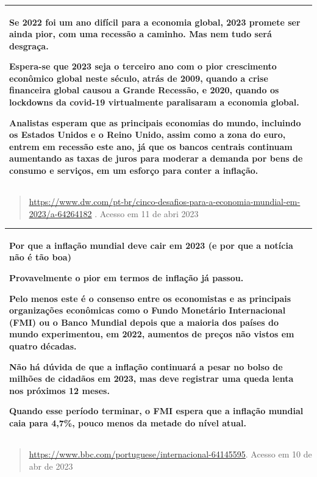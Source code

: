 {\begin{longtable}[]{@{}
  >{\raggedright\arraybackslash}p{}@{}}
Se 2022 foi um ano difícil para a economia global, 2023 promete ser
ainda pior, com uma recessão a caminho. Mas nem tudo será desgraça.

Espera-se que 2023 seja o terceiro ano com o pior crescimento econômico
global neste século, atrás de 2009, quando a crise financeira global
causou a Grande Recessão, e 2020, quando os lockdowns da covid-19
virtualmente paralisaram a economia global.

Analistas esperam que as principais economias do mundo, incluindo os
Estados Unidos e o Reino Unido, assim como a zona do euro, entrem em
recessão este ano, já que os bancos centrais continuam aumentando as
taxas de juros para moderar a demanda por bens de consumo e serviços, em
um esforço para conter a inflação. \\
\bottomrule
\end{longtable}

\begin{quote}
\href{https://www.dw.com/pt-br/cinco-desafios-para-a-economia-mundial-em-2023/a-64264182}{\uline{https://www.dw.com/pt-br/cinco-desafios-para-a-economia-mundial-em-2023/a-64264182}}
. Acesso em 11 de abri 2023
\end{quote}

\begin{longtable}[]{@{}
  >{\raggedright\arraybackslash}p{}@{}}
\toprule
\endhead
\textbf{Por que a inflação mundial deve cair em 2023 (e por que a
notícia não é tão boa)}

Provavelmente o pior em termos de inflação já passou.

Pelo menos este é o consenso entre os economistas e as principais
organizações econômicas como o Fundo Monetário Internacional (FMI) ou o
Banco Mundial depois que a maioria dos países do mundo experimentou, em
2022, aumentos de preços não vistos em quatro décadas.

Não há dúvida de que a inflação continuará a pesar no bolso de milhões
de cidadãos em 2023, mas deve registrar uma queda lenta nos próximos 12
meses.

Quando esse período terminar, o FMI espera que a inflação mundial caia
para 4,7\%, pouco menos da metade do nível atual. \\
\bottomrule
\end{longtable}

\begin{quote}
\href{https://www.bbc.com/portuguese/internacional-64145595}{\uline{https://www.bbc.com/portuguese/internacional-64145595}}.
Acesso em 10 de abr de 2023
\end{quote}

}
